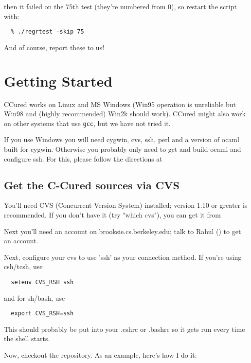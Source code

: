 \documentclass{book}
\def\t#1{{\tt #1}}
\begin{document}
then it failed on the 75th test (they're numbered from 0), so restart
the script with:

\begin{verbatim}
  % ./regrtest -skip 75
\end{verbatim}

And of course, report these to us!


        \chapter{Getting Started}\label{ch-start}

 CCured works on Linux and MS Windows (Win95 operation is unreliable but Win98
and (highly recommended) Win2k should work). CCured might also work on other
systems that use \t{gcc}, but we have not tried it.

 If you use Windows you will need cygwin, cvs, ssh, perl and a version of
ocaml built for cygwin. Otherwise you probably only need to get and build
ocaml and configure ssh. For this, please follow the directions at


\section{Get the C-Cured sources via CVS}

You'll need CVS (Concurrent Version System) installed; version 1.10 or
greater is recommended.  If you don't have it (try "which cvs"), you can
get it from


Next you'll need an account on brooksie.cs.berkeley.edu; talk to Rahul
() to get an account.

Next, configure your cvs to use 'ssh' as your connection method.  If you're
using csh/tcsh, use

\begin{verbatim}
  setenv CVS_RSH ssh
\end{verbatim}

  
and for sh/bash, use

\begin{verbatim}
  export CVS_RSH=ssh
\end{verbatim}

This should probably be put into your .cshrc or .bashrc so it gets run
every time the shell starts.

Now, checkout the repository.  As an example, here's how I do it:
\end{document}
